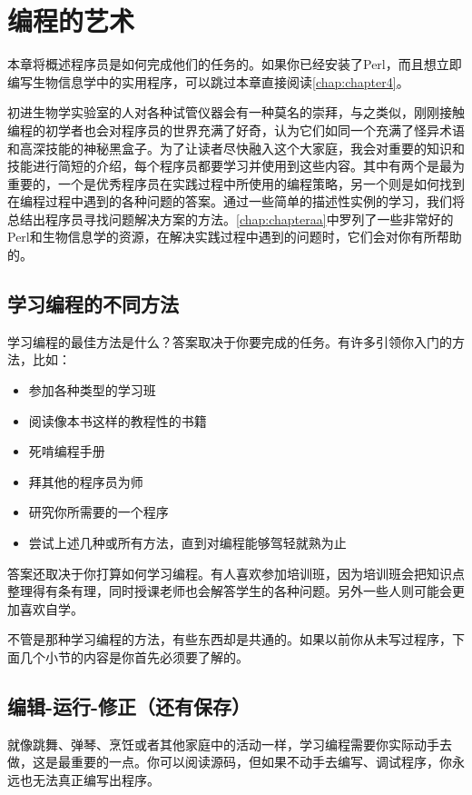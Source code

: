 \chapter{编程的艺术}
\label{chap:chapter3}
\minitoc

本章将概述程序员是如何完成他们的任务的。如果你已经安装了Perl，而且想立即编写生物信息学中的实用程序，可以跳过本章直接阅读\autoref{chap:chapter4}。

初进生物学实验室的人对各种试管仪器会有一种莫名的崇拜，与之类似，刚刚接触编程的初学者也会对程序员的世界充满了好奇，认为它们如同一个充满了怪异术语和高深技能的神秘黑盒子。为了让读者尽快融入这个大家庭，我会对重要的知识和技能进行简短的介绍，每个程序员都要学习并使用到这些内容。其中有两个是最为重要的，一个是优秀程序员在实践过程中所使用的编程策略，另一个则是如何找到在编程过程中遇到的各种问题的答案。通过一些简单的描述性实例的学习，我们将总结出程序员寻找问题解决方案的方法。\autoref{chap:chapteraa}中罗列了一些非常好的Perl和生物信息学的资源，在解决实践过程中遇到的问题时，它们会对你有所帮助的。

\section{学习编程的不同方法}
学习编程的最佳方法是什么？答案取决于你要完成的任务。有许多引领你入门的方法，比如：

\begin{itemize}
  \item 参加各种类型的学习班
  \item 阅读像本书这样的教程性的书籍
  \item 死啃编程手册
  \item 拜其他的程序员为师
  \item 研究你所需要的一个程序
  \item 尝试上述几种或所有方法，直到对编程能够驾轻就熟为止
\end{itemize}

答案还取决于你打算如何学习编程。有人喜欢参加培训班，因为培训班会把知识点整理得有条有理，同时授课老师也会解答学生的各种问题。另外一些人则可能会更加喜欢自学。

不管是那种学习编程的方法，有些东西却是共通的。如果以前你从未写过程序，下面几个小节的内容是你首先必须要了解的。

\section{编辑-运行-修正（还有保存）}
就像跳舞、弹琴、烹饪或者其他家庭中的活动一样，学习编程需要你实际动手去做，这是最重要的一点。你可以阅读源码，但如果不动手去编写、调试程序，你永远也无法真正编写出程序。

